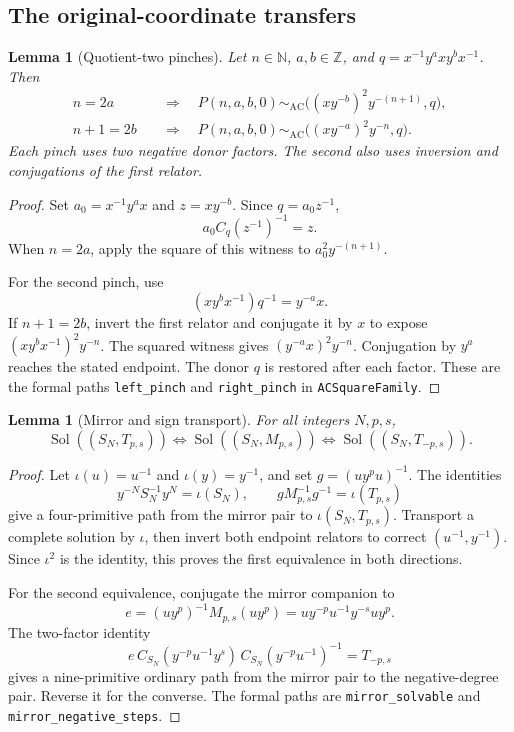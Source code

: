 \documentclass[11pt]{article}
\newtheorem{lemma}[theorem]{Lemma}
\theoremstyle{definition}\newtheorem{definition}[theorem]{Definition}
\theoremstyle{remark}\newtheorem{remark}[theorem]{Remark}
\newcommand{\Sol}{\operatorname{Sol}}
\newcommand{\AC}{\mathrel{\sim_{\mathrm{AC}}}}
\begin{document}
\subsection{The original-coordinate transfers}
\begin{lemma}[Quotient-two pinches]\label{lem:pinch}
Let $n\in\mathbb N$, $a,b\in\mathbb Z$, and $q=x^{-1}y^axy^bx^{-1}$. Then
\[
\begin{aligned}
n=2a&\quad\Longrightarrow\quad
P(n,a,b,0)\AC\bigl((xy^{-b})^2y^{-(n+1)},q\bigr),\\
n+1=2b&\quad\Longrightarrow\quad
P(n,a,b,0)\AC\bigl((xy^{-a})^2y^{-n},q\bigr).
\end{aligned}
\]
Each pinch uses two negative donor factors. The second also uses inversion and conjugations of the first relator.
\end{lemma}
\begin{proof}
Set $a_0=x^{-1}y^ax$ and $z=xy^{-b}$. Since $q=a_0z^{-1}$,
\[
a_0C_q(z^{-1})^{-1}=z.
\]
When $n=2a$, apply the square of this witness to $a_0^2y^{-(n+1)}$.

For the second pinch, use
\[
(xy^bx^{-1})q^{-1}=y^{-a}x.
\]
If $n+1=2b$, invert the first relator and conjugate it by $x$ to expose $(xy^bx^{-1})^2y^{-n}$. The squared witness gives $(y^{-a}x)^2y^{-n}$. Conjugation by $y^a$ reaches the stated endpoint. The donor $q$ is restored after each factor. These are the formal paths \texttt{left\_pinch} and \texttt{right\_pinch} in \texttt{ACSquareFamily}.
\end{proof}

\begin{lemma}[Mirror and sign transport]\label{lem:sign}
For all integers $N,p,s$,
\[
\Sol((S_N,T_{p,s}))\iff\Sol((S_N,M_{p,s}))\iff\Sol((S_N,T_{-p,s})).
\]
\end{lemma}
\begin{proof}
Let $\iota(u)=u^{-1}$ and $\iota(y)=y^{-1}$, and set $g=(uy^pu)^{-1}$. The identities
\[
y^{-N}S_N^{-1}y^N=\iota(S_N),\qquad
gM_{p,s}^{-1}g^{-1}=\iota(T_{p,s})
\]
give a four-primitive path from the mirror pair to $\iota(S_N,T_{p,s})$. Transport a complete solution by $\iota$, then invert both endpoint relators to correct $(u^{-1},y^{-1})$. Since $\iota^2$ is the identity, this proves the first equivalence in both directions.

For the second equivalence, conjugate the mirror companion to
\[
e=(uy^p)^{-1}M_{p,s}(uy^p)=uy^{-p}u^{-1}y^{-s}uy^p.
\]
The two-factor identity
\[
e\,C_{S_N}(y^{-p}u^{-1}y^s)\,C_{S_N}(y^{-p}u^{-1})^{-1}=T_{-p,s}
\]
gives a nine-primitive ordinary path from the mirror pair to the negative-degree pair. Reverse it for the converse. The formal paths are \texttt{mirror\_solvable} and \texttt{mirror\_negative\_steps}.
\end{proof}
\end{document}
